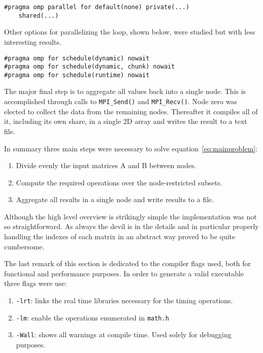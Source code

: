 \begin{lstlisting}
#pragma omp parallel for default(none) private(...)
	shared(...)
\end{lstlisting}

Other options for parallelizing the loop, shown below, were studied but with less interesting results.

\begin{lstlisting}
#pragma omp for schedule(dynamic) nowait
#pragma omp for schedule(dynamic, chunk) nowait
#pragma omp for schedule(runtime) nowait
\end{lstlisting}

The major final step is to aggregate all values back into a single node. This is accomplished through calls to \texttt{MPI\_Send()} and \texttt{MPI\_Recv()}.
Node zero was elected to collect the data from the remaining nodes. Thereafter it compiles all of it, including its own share, in a single 2D array and writes the result to a text file.

In summary three main steps were necessary to solve equation~\ref{eq:mainproblem}:
\begin{enumerate}
\item Divide evenly the input matrices A and B between nodes.
\item Compute the required operations over the node-restricted subsets.
\item Aggregate all results in a single node and write results to a file.
\end{enumerate}

Although the high level overview is strikingly simple the implementation was not so straightforward. As always the devil is in the details and in particular properly handling the indexes of each matrix in an abstract way proved to be quite cumbersome.

The last remark of this section is dedicated to the compiler flags used, both for functional and performance purposes.
In order to generate a valid executable three flags were use:
\begin{enumerate}
\item \texttt{-lrt}: links the real time libraries necessary for the timing operations.
\item \texttt{-lm}: enable the operations enumerated in \texttt{math.h}
\item \texttt{-Wall}: shows all warnings at compile time. Used solely for debugging purposes.
\end{enumerate}


